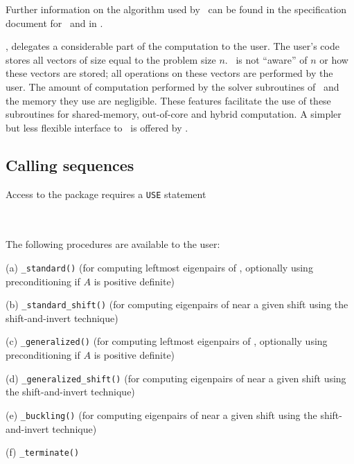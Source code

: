 Further information on the algorithm used by
\fullpackagename\ can be found in the
specification document for \engine\
and in \report.

\fullpackagename,
delegates 
a considerable part of the computation to the user.
The user's code stores all  vectors  of size equal to the problem size $n$.
\fullpackagename\
is not ``aware'' of $n$ or how these vectors are stored; 
all operations on these vectors are performed by the user.
The amount of computation performed by 
the solver subroutines of \fullpackagename\
and the memory they use are negligible. 
These features facilitate the use of these subroutines
for shared-memory, out-of-core and hybrid computation.
A simpler but less flexible interface to
\fullpackagename\
is offered by \simple.

\subsection{Calling sequences}

\label{sec:call}

Access to the package requires a {\tt USE} statement \\ \\
\indent\hspace{8mm}{\tt use \fullpackagename} \\

\medskip

\noindent The following procedures are available to the user:
%
\begin{description}
\vspace{-0.1cm}
\item (a) {\tt \solver\_standard()} 
(for computing leftmost eigenpairs of , 
optionally using preconditioning if $A$ is positive definite)
\item (b) {\tt \solver\_standard\_shift()} 
(for computing eigenpairs of  near a given shift %
using the shift-and-invert technique)
\item (c) {\tt \solver\_generalized()} 
(for computing leftmost eigenpairs of 
, optionally using preconditioning if $A$ is positive definite)
\item (d) {\tt \solver\_generalized\_shift()} 
(for computing eigenpairs of 
\Ref{evp.g} near a given shift %
using the shift-and-invert technique)
\item (e) {\tt \solver\_buckling()} 
(for computing eigenpairs of 
\Ref{evp.b} near a given shift %
using the shift-and-invert technique)
\item (f) {\tt \solver\_terminate()} 
%
\end{description}

